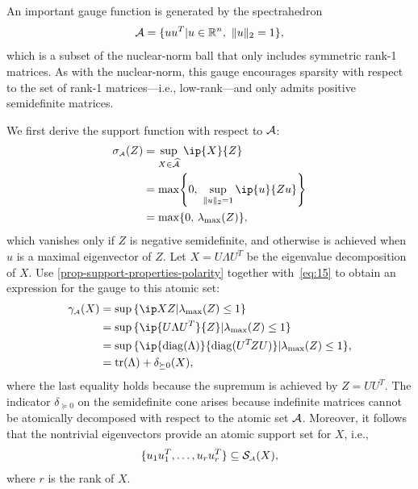 \begin{example} \label{example-trace-norm}

  An important gauge function is generated by the spectrahedron
  \[\mathcal{A} = \{uu^T | u\in\mathbb{R}^n,\ \|u\|_2 = 1\},\] which is a subset of the
  nuclear-norm ball that only includes symmetric rank-1 matrices. As with the
  nuclear-norm, this gauge
  encourages sparsity with respect to the set of rank-1
  matrices---i.e., low-rank---and only admits positive semidefinite matrices.

  We first derive the support function with respect to $\mathcal{A}$:
  \begin{align*}
    \sigma\As(Z) &= \sup_{X\in\convA}\,\ip{X}{Z} \\&=
    \max\Biggl\{
      0,\ \sup_{\|u\|_2 = 1} \ip{u}{Zu}
      \Biggr\} \\ &=
    \max\{0,\,\lambda_{\max}(Z)\},
  \end{align*}
  which vanishes only if $Z$ is negative semidefinite, and otherwise
  is achieved when $u$ is a maximal eigenvector of $Z$.  Let
  $X=U\Lambda U^T$ be the eigenvalue decomposition of $X$. Use
  \autoref{prop-support-properties-polarity} together with~\eqref{eq:15}
  to obtain an expression for the gauge to this atomic set:
  \begin{align*}
    \gauge\As(X)
    &= \sup\,\{\ip X Z | \lambda_{\max}(Z) \leq 1\}
  \\&= \sup\,\{\ip{U\Lambda U^T}{Z} | \lambda_{\max}(Z) \leq 1\}
  \\&= \sup\,\{\ip{\diag(\Lambda)}{\diag(U\T Z U)} | \lambda_{\max}(Z) \leq 1\},
  \\&= \trace(\Lambda) + \delta_{\succeq0}(X),
  \end{align*}
  where the last equality holds because the supremum is achieved by $Z = UU^T$.
  The indicator $\delta_{\succeq0}$ on the semidefinite cone arises because
  indefinite matrices cannot be atomically decomposed with respect to the atomic
  set $\mathcal{A}$. Moreover, it follows that the nontrivial eigenvectors provide an
  atomic support set for $X$, i.e.,
  \begin{equation*} 
    \{u_1u_1^T,\ldots ,u_ru_r^T\} \subseteq \mathcal{S}_{\scriptscriptstyle\mathcal{A}}(X),
  \end{equation*}
  where $r$ is the rank of $X$.


\end{example}
